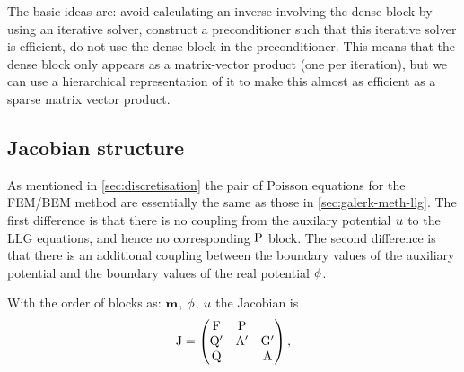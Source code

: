 The basic ideas are: avoid calculating an inverse involving the dense block by using an iterative solver, construct a preconditioner such that this iterative solver is efficient, do not use the dense block in the preconditioner.
This means that the dense block only appears as a matrix-vector product (one per iteration), but we can use a hierarchical representation of it to make this almost as efficient as a sparse matrix vector product.


\subsection{Jacobian structure}
\label{sec:bem-jacobian-structure}

As mentioned in \cref{sec:discretisation} the pair of Poisson equations for the FEM/BEM method are essentially the same as those in \cref{sec:galerk-meth-llg}.
The first difference is that there is no coupling from the auxilary potential $u$ to the LLG equations, and hence no corresponding $\mathrm{P}$ block.
The second difference is that there is an additional coupling between the boundary values of the auxiliary potential and the boundary values of the real potential $\phi$.

With the order of blocks as: $\mathbf{m}$, $\phi$, $u$ the Jacobian is
\begin{equation}
  \mathrm{J} = 
  \begin{pmatrix}
    \mathrm{F}       & \mathrm{P}     &  \\
    \mathrm{Q}'      & \mathrm{A}' &  {\mathbf{\mathrm{G}}}'  \\
    \mathrm{Q}       &         &   \mathrm{A}
  \end{pmatrix},
\label{eq:16}
\end{equation}


